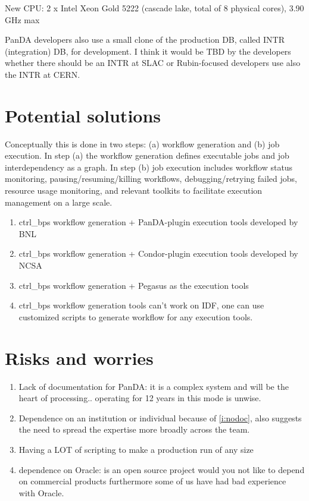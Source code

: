 New CPU: 2 x Intel Xeon Gold 5222 (cascade lake, total of 8 physical cores), 3.90 GHz max

PanDA developers also use a small clone of the production DB, called INTR (integration) DB, for development. I think it would be TBD by the developers whether there should be an INTR at SLAC or Rubin-focused developers use also the INTR at CERN.


\section {Potential solutions} \label{sec:potential}

Conceptually this is done in two steps: (a) workflow generation and (b) job execution.
In step (a) the workflow generation defines executable jobs and job interdependency as a graph.
In step (b) job execution includes workflow status monitoring, pausing/resuming/killing workflows, debugging/retrying failed jobs, resource usage monitoring, and relevant toolkits to facilitate execution management on a large scale.
\begin{enumerate}
\item  ctrl\_bps workflow generation + PanDA-plugin execution tools developed by BNL
\item ctrl\_bps workflow generation + Condor-plugin execution tools developed by NCSA
\item ctrl\_bps workflow generation + Pegasus as the execution tools
\item ctrl\_bps workflow generation tools can't work on IDF, one can use customized scripts to generate workflow for any execution tools.
\end{enumerate}



\section {Risks and worries}

\begin{enumerate}
\item Lack of documentation for PanDA: it is a complex system and will
  be the heart of processing.. operating for 12 years in this mode is unwise.\label{i:nodoc}
\item Dependence on an institution or individual because of
  \ref{i:nodoc}, also suggests the need to spread the expertise more
  broadly across the team.
\item Having a LOT of scripting to make a production run of any size
\item dependence on Oracle: is an open source project would you not like to depend on commercial products furthermore some of us have had bad experience with Oracle.
\end{enumerate}
